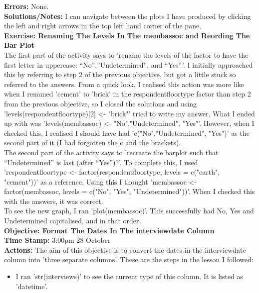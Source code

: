 \documentclass{article}
\begin{document}
\begin{FlushLeft}
\textbf{Errors:} None.\\
\textbf{Solutions/Notes:} I can navigate between the plots I have produced by clicking the left and right arrows in the top left hand corner of the pane.\\
\vspace{5mm}
\textbf{Exercise: Renaming The Levels In The memb\textunderscore assoc and Reording The Bar Plot}\\ 
The first part of the activity says to 'rename the levels of the factor to have the first letter in uppercase: “No”,”Undetermined”, and “Yes”'. I initially approached this by referring to step 2 of the previous objective, but got a little stuck so referred to the answers. From a quick look, I realised this action was more like when I renamed 'cement' to 'brick' in the respondent\textunderscore floor\textunderscore type factor than step 2 from the previous objective, so I closed the solutions and using 'levels(respondent\textunderscore floor\textunderscore type)[2] \textless - "brick"' tried to write my answer. What I ended up with was 'levels(memb\textunderscore assoc) \textless - "No","Undetermined", "Yes"'. However, when I checked this, I realised I should have had 'c("No","Undetermined", "Yes")' as the second part of it (I had forgotten the c and the brackets).\\
The second part of the activity says to 'recreate the barplot such that “Undetermined” is last (after “Yes”)?'. To complete this, I used 'respondent\textunderscore floor\textunderscore type \textless - factor(respondent\textunder floor\textunderscore type, levels = c("earth", "cement"))' as a reference. Using this I thought 'memb\textunderscore assoc \textless - factor(memb\textunderscore assoc, levels = c("No", "Yes", "Undetermined"))'. When I checked this with the answers, it was correct.\\
To see the new graph, I ran 'plot(memb\textunderscore assoc)'. This successfully had No, Yes and Undetermined capitalised, and in that order.\\
\vspace{5mm}
\textbf{Objective: Format The Dates In The interview\textunderscore date Column}\\ 
\textbf{Time Stamp:} 3:00pm 28 October\\
\textbf{Actions:} The aim of this objective is to convert the dates in the interview\textunderscore date column into 'three separate columns'. These are the steps in the lesson I followed:
\begin{itemize}
    \item I ran 'str(interviews)' to see the current type of this column. It is listed as 'datetime'.

\end{itemize}
\end{FlushLeft}
\end{document}
